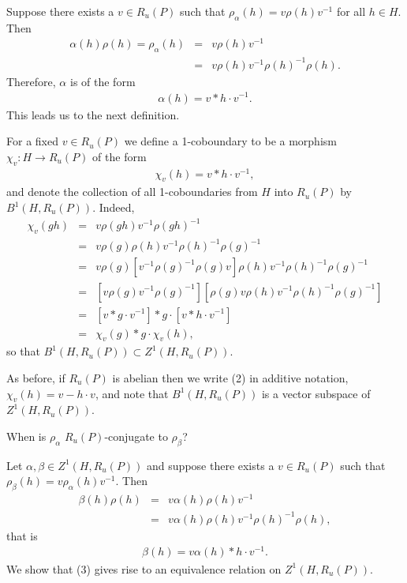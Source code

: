Suppose there exists a $v\in R_u(P)$ such that $\rho_\alpha(h) = v\rho(h)v^{-1}$ for all $h\in H$. Then
\begin{eqnarray*}
	\alpha(h)\rho(h) = \rho_\alpha(h) &=& v\rho(h)v^{-1}\\
	&=& v\rho(h)v^{-1}\rho(h)^{-1}\rho(h).
\end{eqnarray*}
Therefore, $\alpha$ is of the form
\begin{eqnarray*}
	\alpha(h) = v*h\cdot v^{-1}.
\end{eqnarray*}
This leads us to the next definition. 

For a fixed $v\in R_u(P)$ we define a 1-coboundary to be a morphism $\chi_v: H \rightarrow R_u(P)$ of the form
\begin{eqnarray}
\chi_v(h) = v*h\cdot v^{-1}, 
\end{eqnarray}
and denote the collection of all 1-coboundaries from $H$ into $R_u(P)$ by $B^1(H,R_u(P))$. Indeed,
\begin{eqnarray*}
	\chi_v(gh) &=& v\rho(gh)v^{-1}\rho(gh)^{-1} \\
	&=& v\rho(g)\rho(h)v^{-1}\rho(h)^{-1}\rho(g)^{-1} \\
	&=&  v\rho(g)\left[v^{-1}\rho(g)^{-1}\rho(g)v\right]\rho(h)v^{-1}\rho(h)^{-1}\rho(g)^{-1} \\
	&=& \left[v\rho(g)v^{-1}\rho(g)^{-1}\right]\left[\rho(g)v\rho(h)v^{-1}\rho(h)^{-1}\rho(g)^{-1}\right] \\
	&=& \left[v*g\cdot v^{-1}\right]*g\cdot \left[v*h\cdot v^{-1}\right] \\
	&=& \chi_v(g) * g\cdot \chi_v(h),
\end{eqnarray*}
so that $B^1(H,R_u(P))\subset Z^1(H,R_u(P))$.

As before, if $R_u(P)$ is abelian then we write (2) in additive notation, $\chi_v(h)=v-h\cdot v$, and note that $B^1(H,R_u(P))$ is a vector subspace of $Z^1(H,R_u(P))$.

When is $\rho_\alpha$ $R_u(P)$-conjugate to $\rho_\beta$?

Let $\alpha,\beta\in Z^1(H,R_u(P))$ and suppose there exists a $v\in R_u(P)$ such that $\rho_\beta(h) = v\rho_\alpha(h)v^{-1}$. Then
\begin{eqnarray*}
	\beta(h)\rho(h) &=& v\alpha(h)\rho(h)v^{-1} \\
	&=&v\alpha(h)\rho(h)v^{-1}\rho(h)^{-1}\rho(h),
\end{eqnarray*}
that is
\begin{eqnarray}
	\beta(h) = v\alpha(h)*h\cdot v^{-1}.
\end{eqnarray}
We show that (3) gives rise to an equivalence relation on $Z^1(H,R_u(P))$. 

